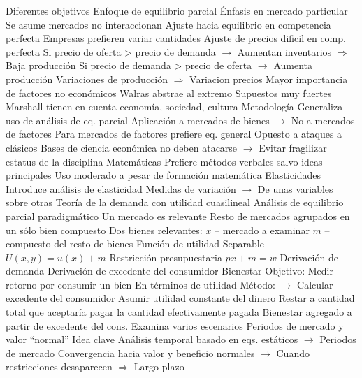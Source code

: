 \documentclass{nuevotema}
\begin{document}
\begin{esquemal}
				\4[] Diferentes objetivos
				\4 Enfoque de equilibrio parcial
				\4[] Énfasis en mercado particular
				\4[] Se asume mercados no interaccionan
				\4 Ajuste hacia equilibrio en competencia perfecta
				\4[] Empresas prefieren variar cantidades
				\4[] Ajuste de precios dificil en comp. perfecta
				\4[] Si precio de oferta > precio de demanda
				\4[] $\to$ Aumentan inventarios $\Rightarrow$ Baja producción
				\4[] Si precio de demanda > precio de oferta
				\4[] $\to$ Aumenta producción
				\4[] Variaciones de producción $\Rightarrow$ Variacion precios
				\4 Mayor importancia de factores no económicos
				\4[] Walras abstrae al extremo
				\4[] Supuestos muy fuertes
				\4[] Marshall tienen en cuenta economía, sociedad, cultura
			\3 Metodología
				\4 Generaliza uso de análisis de eq. parcial
				\4[] Aplicación a mercados de bienes
				\4[] $\to$ No a mercados de factores
				\4[] Para mercados de factores prefiere eq. general
				\4 Opuesto a ataques a clásicos
				\4[] Bases de ciencia económica no deben atacarse
				\4[] $\to$ Evitar fragilizar estatus de la disciplina
				\4 Matemáticas
				\4[] Prefiere métodos verbales salvo ideas principales
				\4[] Uso moderado a pesar de formación matemática
				\4 Elasticidades
				\4[] Introduce análisis de elasticidad
				\4[] Medidas de variación
				\4[] $\to$ De unas variables sobre otras
			\3 Teoría de la demanda con utilidad cuasilineal
				\4 Análisis de equilibrio parcial paradigmático
				\4[] Un mercado es relevante
				\4[] Resto de mercados agrupados en un sólo bien compuesto
				\4 Dos bienes relevantes:
				\4[] $x$ -- mercado a examinar
				\4[] $m$ -- compuesto del resto de bienes
				\4 Función de utilidad
				\4[] Separable
				\4[] $U(x,y) = u(x) + m$
				\4 Restricción presupuestaria
				\4[] $px + m = w$
				\4[$\Rightarrow$] Derivación de demanda
				\4[$\Rightarrow$] Derivación de excedente del consumidor
			\3 Bienestar
				\4 Objetivo:
				\4[] Medir retorno por consumir un bien
				\4[] En términos de utilidad
				\4 Método:
				\4[] $\to$ Calcular excedente del consumidor
				\4[] Asumir utilidad constante del dinero
				\4[] Restar a cantidad total que aceptaría pagar
				\4[] la cantidad efectivamente pagada
				\4 Bienestar agregado a partir de excedente del cons.
				\4[] Examina varios escenarios
			\3 Periodos de mercado y valor ``normal''
				\4 Idea clave
				\4[] Análisis temporal basado en eqs. estáticos
				\4[] $\to$ Periodos de mercado
				\4[] Convergencia hacia valor y beneficio normales
				\4[] $\to$ Cuando restricciones desaparecen
				\4[] $\Rightarrow$ Largo plazo

\end{esquemal}
\end{document}
